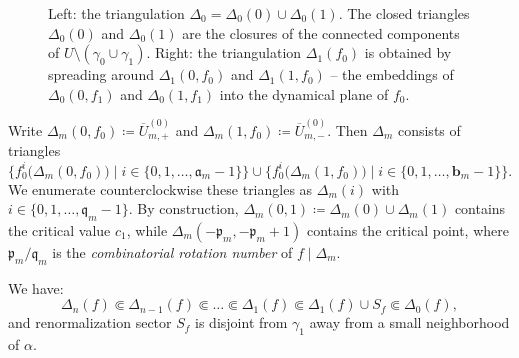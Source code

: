 \documentclass{amsart}
\newcommand{\1}{{\mathbb 1 }}
\newcommand{\bDelta}{{\mathbb{\Delta}}}
\newcommand{\pp}{\mathfrak{p}}
\renewcommand{\aa}{\mathfrak{a}}
\newcommand{\bb}{{\mathbf b}}
\renewcommand{\qq}{\mathfrak{q}}
\theoremstyle{remark}
\numberwithin{equation}{section}
\theoremstyle{definition}
\theoremstyle{nonumberbreak}
\begin{document}
\begin{figure}[tp!]
{}
\caption{Left: the triangulation $\bDelta_0=\Delta_0(0)\cup \Delta_0(1)$. The closed triangles $\Delta_0(0)$ and $\Delta_0(1)$ are the closures of the connected components of $U\setminus (\gamma_0\cup \gamma_1)$. Right: the triangulation $\bDelta_1(f_0)$ is obtained by spreading around $\Delta_1(0,f_0)$ and $\Delta_1(1,f_0)$ -- the embeddings of $\Delta_0(0,f_1)$ and $ \Delta_0(1,f_1)$ into the dynamical plane of $f_0$.}
\label{Fig:ren triang:f0}
\end{figure}

Write $\Delta_m(0,f_0)\coloneqq \overline U^{(0)}_{m,+}$ and $\Delta_m(1,f_0)\coloneqq \overline U^{(0)}_{m,-}$. Then $\bDelta_m$ consists of triangles 
\[\big\{f_0^i\big(\Delta_m(0,f_0) \big)\mid i\in\{0,1,\dots, \aa_m-1\}\big\}\cup \big\{f_0^i\big(\Delta_m(1,f_0) \big)\mid i\in\{0,1,\dots, \bb_m-1\}\big\}.\] 
We enumerate counterclockwise these triangles as $\Delta_m(i)$ with $i\in \{0,1,\dots, \qq_m-1\}$. By construction, $\Delta_m(0,1)\coloneqq \Delta_m(0)\cup \Delta_m(1)$ contains the critical value $c_1$, while $\Delta_m(-\pp_m,-\pp_m+1)$ contains the critical point, where $\pp_m/\qq_m$ is the \emph{combinatorial rotation number} of $f\mid \bDelta_m $.  

We have:
\begin{equation} 
\label{eq:ImprOfDomain}
 \bDelta_n(f)\Subset \bDelta_{n-1}(f)\Subset \dots\Subset \bDelta_1(f) \Subset \bDelta_1(f)\cup S_f \Subset \bDelta_0(f),
\end{equation}
and renormalization sector $S_f$ is disjoint from $\gamma_1$ away from a small neighborhood of $\alpha$.
\end{document}
